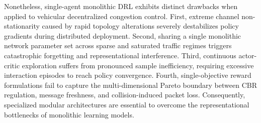 \documentclass[journal]{IEEEtran}
\begin{document}
Nonetheless, single-agent monolithic DRL exhibits distinct drawbacks when applied to vehicular decentralized congestion control. First, extreme channel non-stationarity caused by rapid topology alterations severely destabilizes policy gradients during distributed deployment. Second, sharing a single monolithic network parameter set across sparse and saturated traffic regimes triggers catastrophic forgetting and representational interference. Third, continuous actor-critic exploration suffers from pronounced sample inefficiency, requiring excessive interaction episodes to reach policy convergence. Fourth, single-objective reward formulations fail to capture the multi-dimensional Pareto boundary between CBR regulation, message freshness, and collision-induced packet loss. Consequently, specialized modular architectures are essential to overcome the representational bottlenecks of monolithic learning models.
\end{document}

